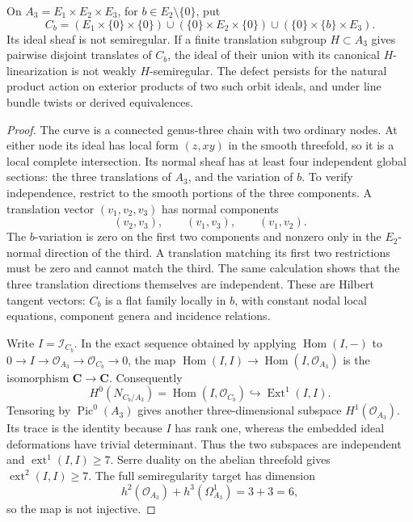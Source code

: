 \begin{proposition}
\label{SF-CM05}
On $A_3=E_1\times E_2\times E_3$, for $b\in E_2\setminus\{0\}$,
put
\[
 C_b=(E_1\times\{0\}\times\{0\})
 \cup(\{0\}\times E_2\times\{0\})
 \cup(\{0\}\times\{b\}\times E_3).
\]
Its ideal sheaf is not semiregular. If a finite translation subgroup
$H\subset A_3$ gives pairwise disjoint translates of $C_b$, the
ideal of their union with its canonical $H$-linearization is not
weakly $H$-semiregular. The defect persists for the natural product
action on exterior products of two such orbit ideals, and under line
bundle twists or derived equivalences.
\end{proposition}
\begin{proof}
The curve is a connected genus-three chain with two ordinary nodes.
At either node its ideal has local form $(z,xy)$ in the smooth
threefold, so it is a local complete intersection. Its normal sheaf
has at least four independent global sections: the three translations
of $A_3$, and the variation of $b$. To verify independence, restrict
to the smooth portions of the three components. A translation vector
$(v_1,v_2,v_3)$ has normal components
\[
 (v_2,v_3),\qquad(v_1,v_3),\qquad(v_1,v_2).
\]
The $b$-variation is zero on the first two components and nonzero
only in the $E_2$-normal direction of the third. A translation
matching its first two restrictions must be zero and cannot match
the third. The same calculation shows that the three translation
directions themselves are independent. These are Hilbert tangent
vectors: $C_b$ is a flat family locally in $b$, with constant nodal
local equations, component genera and incidence relations.

Write $I=\mathcal I_{C_b}$. In the exact sequence obtained by applying
$\operatorname{Hom}(I,-)$ to
$0\to I\to\mathcal O_{A_3}\to\mathcal O_{C_b}\to0$,
the map $\operatorname{Hom}(I,I)\to\operatorname{Hom}(I,\mathcal O_{A_3})$
is the isomorphism $\mathbf C\to\mathbf C$. Consequently
\[
 H^0(N_{C_b/A_3})=\operatorname{Hom}(I,\mathcal O_{C_b})
 \hookrightarrow\operatorname{Ext}^1(I,I).
\]
Tensoring by $\operatorname{Pic}^0(A_3)$ gives another
three-dimensional subspace $H^1(\mathcal O_{A_3})$. Its trace is
the identity because $I$ has rank one, whereas the embedded ideal
deformations have trivial determinant. Thus the two subspaces are
independent and $\operatorname{ext}^1(I,I)\ge7$.
Serre duality on the abelian threefold gives
$\operatorname{ext}^2(I,I)\ge7$. The full semiregularity target has
dimension
\[
 h^2(\mathcal O_{A_3})+h^3(\Omega^1_{A_3})=3+3=6,
\]
so the map is not injective.


\end{proof}
